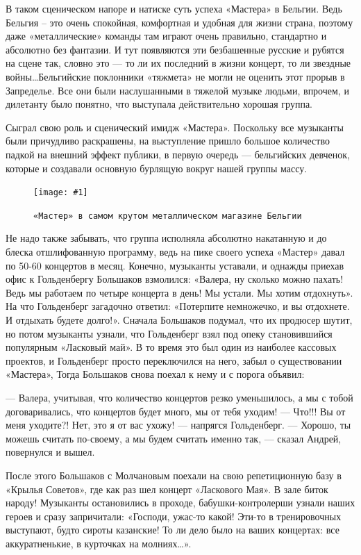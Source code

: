 \documentclass[16pt,a5paper]{book}
\newcommand{\myincludegraphics}[1]{\texttt{[image: \#1]}}
\begin{document}
В таком сценическом напоре и натиске суть успеха «Мастера» в Бельгии. Ведь Бельгия – это очень спокойная, комфортная и
удобная для жизни страна, поэтому даже «металлические» команды там играют очень правильно, стандартно и абсолютно без
фантазии. И тут появляются эти безбашенные русские и рубятся на сцене так, словно это — то ли их последний в жизни
концерт, то ли звездные войны\ldots Бельгийские поклонники «тяжмета» не могли не оценить этот прорыв в Запределье. Все
они были наслушанными в тяжелой музыке людьми, впрочем, и дилетанту было понятно, что выступала действительно хорошая
группа.

Сыграл свою роль и сценический имидж «Мастера». Поскольку все музыканты были причудливо раскрашены, на выступление
пришло большое количество падкой на внешний эффект публики, в первую очередь — бельгийских девченок, которые и создавали
основную бурлящую вокруг нашей группы массу.

\begin{figure}[h]
    \centering
    \myincludegraphics{Image24}
    \caption{\texttt{«Мастер» в самом крутом металлическом магазине Бельгии}}
\end{figure}

Не надо также забывать, что группа исполняла абсолютно накатанную и до блеска отшлифованную программу, ведь на пике
своего успеха «Мастер» давал по 50-60 концертов в месяц. Конечно, музыканты уставали, и однажды приехав офис к
Гольденбергу Большаков взмолился: «Валера, ну сколько можно пахать! Ведь мы работаем по четыре концерта в день! Мы
устали. Мы хотим отдохнуть». На что Гольденберг загадочно ответил: «Потерпите немножечко, и вы отдохнете. И отдыхать
будете долго!». Сначала Большаков подумал, что их продюсер шутит, но потом музыканты узнали, что Гольденберг взял под
опеку становившийся популярным «Ласковый май». В то время это был один из наиболее кассовых проектов, и Гольденберг
просто переключился на него, забыл о существовании «Мастера», Тогда Большаков снова поехал к нему и с порога объявил:

— Валера, учитывая, что количество концертов резко уменьшилось, а мы с тобой договаривались, что концертов будет много,
мы от тебя уходим!
— Что!!! Вы от меня уходите?! Нет, это я от вас ухожу! — напрягся Гольденберг.
— Хорошо, ты можешь считать по-своему, а мы будем считать именно так, — сказал Андрей, повернулся и вышел.

После этого Большаков с Молчановым поехали на свою репетиционную базу в «Крылья Советов», где как раз шел концерт
«Ласкового Мая». В зале биток народу! Музыканты остановились в проходе, бабушки-контролерши узнали наших героев и сразу
запричитали: «Господи, ужас-то какой! Эти-то в тренировочных выступают, будто сироты казанские! То ли дело было на ваших
концертах: все аккуратненькие, в курточках на молниях\ldots».
\end{document}
